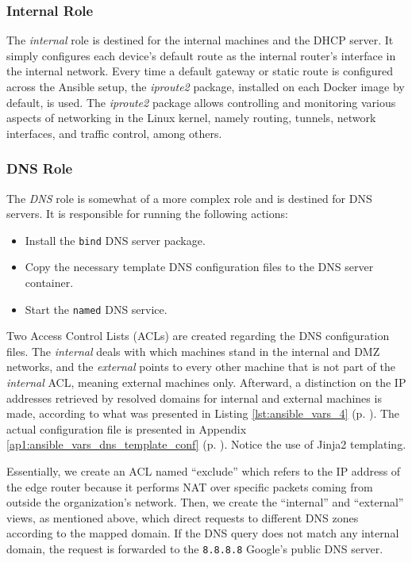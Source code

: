\subsubsection{Internal Role} \label{sec:ansible_internal_role}

The \textit{internal} role is destined for the internal machines and the DHCP server. It simply configures each device's default route as the internal router's interface in the internal network. Every time a default gateway or static route is configured across the Ansible setup, the \textit{iproute2} package, installed on each Docker image by default, is used. The \textit{iproute2} package allows controlling and monitoring various aspects of networking in the Linux kernel, namely routing, tunnels, network interfaces, and traffic control, among others.

\subsubsection{DNS Role} \label{sec:ansible_dns_role}

The \textit{DNS} role is somewhat of a more complex role and is destined for DNS servers. It is responsible for running the following actions:

\begin{itemize}
    \item Install the \texttt{bind} DNS server package.
    \item Copy the necessary template DNS configuration files to the DNS server container.
    \item Start the \texttt{named} DNS service.
\end{itemize}

Two Access Control Lists (ACLs) are created regarding the DNS configuration files. The \textit{internal} deals with which machines stand in the internal and DMZ networks, and the \textit{external} points to every other machine that is not part of the \textit{internal} ACL, meaning external machines only. Afterward, a distinction on the IP addresses retrieved by resolved domains for internal and external machines is made, according to what was presented in Listing \ref{lst:ansible_vars_4} (p. \pageref{lst:ansible_vars_4}). The actual configuration file is presented in Appendix \ref{ap1:ansible_vars_dns_template_conf} (p. \pageref{ap1:ansible_vars_dns_template_conf}). Notice the use of Jinja2 templating. 

Essentially, we create an ACL named ``exclude'' which refers to the IP address of the edge router because it performs NAT over specific packets coming from outside the organization's network. Then, we create the ``internal'' and ``external'' views, as mentioned above, which direct requests to different DNS zones according to the mapped domain. If the DNS query does not match any internal domain, the request is forwarded to the \texttt{8.8.8.8} Google's public DNS server.

